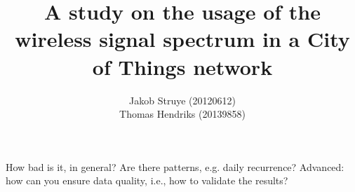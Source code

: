 \documentclass[a4paper, 11pt]{article}
\begin{document}
%
\title{A study on the usage of the wireless signal spectrum in a City of Things network}


\author{
	Jakob Struye (20120612)\\ 
    Thomas Hendriks (20139858)\\
}

How bad is it, in general? 
Are there patterns, e.g. daily recurrence? 
Advanced: how can you ensure data quality, i.e., how to validate the results? 

\maketitle


\tableofcontents
\clearpage
\end{document}
